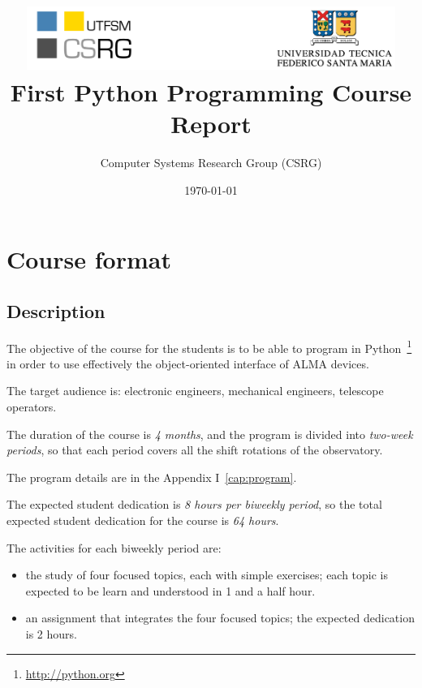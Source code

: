 \documentclass[letter, 10pt]{article}
\begin{document}
\title{\includegraphics[width=0.9\textwidth]{img/logos.pdf}\\\vspace{1cm}
First Python Programming Course Report}
\author{Computer Systems Research Group (CSRG)}
\date{\today}

\maketitle

\section{Course format}

\subsection{Description}

The objective of the course for the students
is to be able to program in Python~\footnote{\url{http://python.org}}
in order to use effectively the object-oriented interface of ALMA devices.

The target audience is: electronic engineers, mechanical engineers, telescope operators. 

The duration of the course is \emph{4 months}, and the program is divided into \emph{two-week periods},
so that each period covers all the shift rotations of the observatory.

The program details are in the Appendix I~\ref{cap:program}.

The expected student dedication is \emph{8 hours per biweekly period},
so the total expected student dedication for the course is \emph{64 hours}.

The activities for each biweekly period are:
\begin{itemize}
    \item the study of four focused topics, each with simple exercises;
          each topic is expected to be learn and understood in 1 and a half hour.
    \item an assignment that integrates the four focused topics;
          the expected dedication is 2 hours.
\end{itemize}
\end{document}
